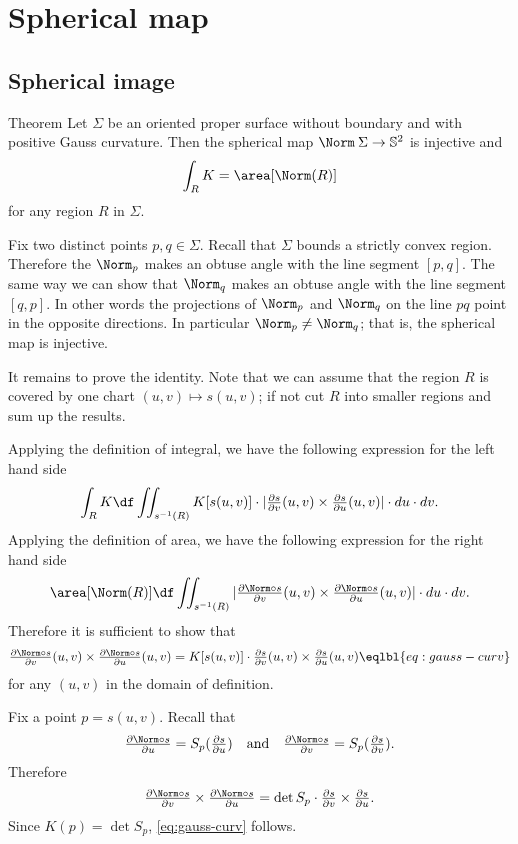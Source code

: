 \chapter{Spherical map}





\section*{Spherical image}


\begin{thm}{Theorem}\label{thm:spherical-image}
Let $\Sigma$ be an oriented proper surface without boundary and with positive Gauss curvature.
Then the spherical map $\Norm\:\Sigma\to\mathbb{S}^2$ is injective and
\[\int_R K=\area[\Norm(R)]\]
for any region $R$ in $\Sigma$. %
\end{thm}

Fix two distinct points $p,q\in\Sigma$.
Recall that $\Sigma$ bounds a strictly convex region.
Therefore the $\Norm_p$ makes an obtuse angle with the line segment $[p,q]$. %
The same way we can show that $\Norm_q$ makes an obtuse angle with the line segment $[q,p]$.
In other words the projections of $\Norm_p$ and $\Norm_q$ on the line $pq$ point in the opposite directions.
In particular $\Norm_p\ne \Norm_q$; that is, the spherical map is injective.

It remains to prove the identity.
Note that we can assume that the region $R$ is covered by one chart $(u,v)\mapsto s(u,v)$; if not cut $R$ into smaller regions and sum up the results.

Applying the definition of integral, we have the following expression for the left hand side
\[\int_R K \df \iint_{s^{-1}(R)} K[s(u,v)]\cdot |\tfrac{\partial s}{\partial v}(u,v)\times\tfrac{\partial s}{\partial u}(u,v)|  \cdot du\cdot dv.\]
Applying the definition of area, we have the following expression for the right hand side
\[\area[\Norm(R)] \df \iint_{s^{-1}(R)}  |\tfrac{\partial \Norm\circ s}{\partial v}(u,v)\times\tfrac{\partial \Norm\circ s}{\partial u}(u,v)|  \cdot du\cdot dv.\]
Therefore it is sufficient to show that 
\[\tfrac{\partial \Norm\circ s}{\partial v}(u,v)\times\tfrac{\partial \Norm\circ s}{\partial u}(u,v)=K[s(u,v)]\cdot \tfrac{\partial s}{\partial v}(u,v)\times\tfrac{\partial s}{\partial u}(u,v)\eqlbl{eq:gauss-curv}\]
for any $(u,v)$ in the domain of definition. 

Fix a point $p=s(u,v)$.
Recall that 
\[\tfrac{\partial \Norm\circ s}{\partial u}=S_p(\tfrac{\partial  s}{\partial u})\quad\text{and}\quad\tfrac{\partial \Norm\circ s}{\partial v}=S_p(\tfrac{\partial  s}{\partial v}).\]
Therefore 
\[\tfrac{\partial \Norm\circ s}{\partial v}\times\tfrac{\partial \Norm\circ s}{\partial u}=\det S_p\cdot \tfrac{\partial s}{\partial v}\times\tfrac{\partial s}{\partial u}.\]
Since $K(p)=\det S_p$, \ref{eq:gauss-curv} follows.
\qeds

